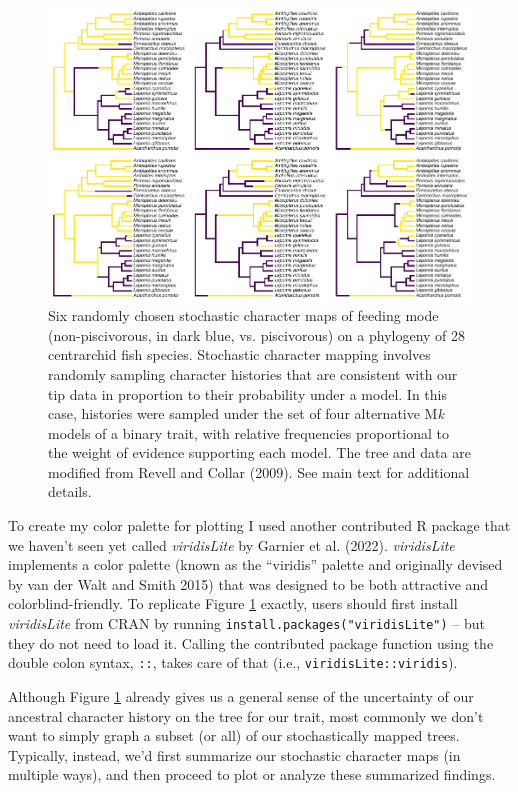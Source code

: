 \documentclass[fleqn,10pt,lineno]{wlpeerj} %
\begin{document}
\begin{figure}
\includegraphics[width=1\linewidth]{Revell.phytools-v2_peerj_files/figure-latex/simmap-trees-1} \caption{Six randomly chosen stochastic character maps of feeding mode (non-piscivorous, in dark blue, vs. piscivorous) on a phylogeny of 28 centrarchid fish species. Stochastic character mapping involves randomly sampling character histories that are consistent with our tip data in proportion to their probability under a model. In this case, histories were sampled under the set of four alternative M\textit{k} models of a binary trait, with relative frequencies proportional to the weight of evidence supporting each model. The tree and data are modified from Revell and Collar (2009). See main text for additional details.}\label{fig:simmap-trees}
\end{figure}

To create my color palette for plotting I used another contributed R package that we haven't seen yet called \emph{viridisLite} by Garnier et al. (2022). \emph{viridisLite} implements a color palette (known as the ``viridis'' palette and originally devised by van der Walt and Smith 2015) that was designed to be both attractive and colorblind-friendly. To replicate Figure \ref{fig:simmap-trees} exactly, users should first install \emph{viridisLite} from CRAN by running \texttt{install.packages("viridisLite")} -- but they do not need to load it. Calling the contributed package function using the double colon syntax, \texttt{::}, takes care of that (i.e., \texttt{viridisLite::viridis}).

Although Figure \ref{fig:simmap-trees} already gives us a general sense of the uncertainty of our ancestral character history on the tree for our trait, most commonly we don't want to simply graph a subset (or all) of our stochastically mapped trees. Typically, instead, we'd first summarize our stochastic character maps (in multiple ways), and then proceed to plot or analyze these summarized findings.
\end{document}
